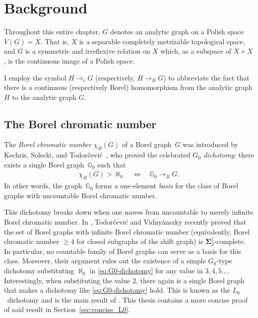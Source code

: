 
\section{Background}\label{sec:descr_combi_background}

Throughout this entire chapter, $G$ denotes an analytic graph on a Polish space $V(G)=X$.
That is, $X$ is a separable completely metrizable topological space, and $G$ is a symmetric and irreflexive relation on $X$ which, as a subspace of $X\times X$, is the continuous image of a Polish space.

I employ the symbol $H\to_cG$ (respectively, $H\to_BG$) to abbreviate the fact that there is a continuous (respectively Borel) homomorphism from the analytic graph $H$ to the analytic graph $G$.

\subsection{The Borel chromatic number}

The \emph{Borel chromatic number} $\chi_B(G)$ of a Borel graph~$G$ was introduced by Kechris, Solecki, and Todorčević~\cite{kechris1999borel}, who proved the celebrated \emph{$G_0$ dichotomy}: there exists a single Borel graph~$\mathbb{G}_0$ such that
\begin{align}\label{eq:G0-dichotomy}
    \chi_B(G) > \aleph_0\quad
    \Longleftrightarrow\quad
    \mathbb{G}_0 \to_B G.
\end{align}
In other words, the graph~$\mathbb{G}_0$ forms a one-element \emph{basis} for the class of Borel graphs with uncountable Borel chromatic number.

This dichotomy breaks down when one moves from uncountable to merely infinite Borel chromatic number.
In \cite{Todorcevic_2021_ComplexProbBorel}, Todorčević and Vidnyánszky recently proved that the set of Borel graphs with infinite Borel chromatic number (equivalently, Borel chromatic number $\geq 4$ for closed subgraphs of the shift graph) is $\mathbf\Sigma^1_2$-complete.
In particular, no countable family of Borel graphs can serve as a basis for this class.
Moreover, their argument rules out the existence of a simple $G_0$-type dichotomy substituting $\aleph_0$ in \eqref{eq:G0-dichotomy} for any value in $3,4,5\dots$.
Interestingly, when substituting the value $2$, there again is a single Borel graph that makes a dichotomy like \eqref{eq:G0-dichotomy} hold.
This is known as the $L_0$~dichotomy and is the main result of \cite{L0paper}.
This thesis contains a more concise proof of said result in Section~\ref{sec:concise_L0}.

